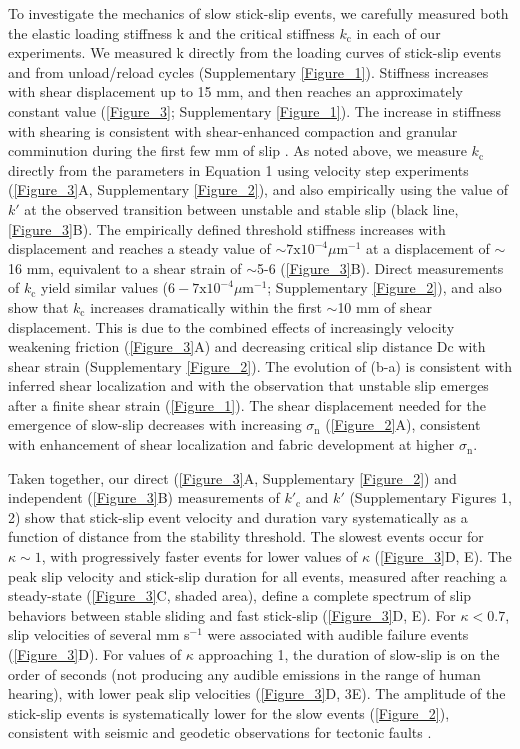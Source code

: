 To investigate the mechanics of slow stick-slip events, we carefully measured both the elastic loading stiffness k and the critical stiffness $k_\text{c}$ in each of our experiments.  We measured k directly from the loading curves of stick-slip events and from unload/reload cycles (Supplementary \ref{Figure_1}).  Stiffness increases with shear displacement up to 15 mm, and then reaches an approximately constant value (\ref{Figure_3}; Supplementary \ref{Figure_1}). The increase in stiffness with shearing is consistent with shear-enhanced compaction and granular comminution during the first few mm of slip \cite{marone1998laboratory}. As noted above, we measure $k_\text{c}$ directly from the parameters in Equation 1 using velocity step experiments (\ref{Figure_3}A, Supplementary \ref{Figure_2}), and also empirically using the value of $k'$ at the observed transition between unstable and stable slip (black line, \ref{Figure_3}B). The empirically defined threshold stiffness increases with displacement and reaches a steady value of $\sim 7\text{x}10^{-4} \mu \text{m}^{-1}$ at a displacement of $\sim$16 mm, equivalent to a shear strain of $\sim$5-6 (\ref{Figure_3}B). Direct measurements of $k_\text{c}$ yield similar values ($6-7\text{x}10^{-4} \mu \text{m}^{-1}$; Supplementary \ref{Figure_2}), and also show that $k_\text{c}$ increases dramatically within the first $\sim$10 mm of shear displacement. This is due to the combined effects of increasingly velocity weakening friction (\ref{Figure_3}A) and decreasing critical slip distance Dc with shear strain (Supplementary \ref{Figure_2}). The evolution of (b-a) is consistent with inferred shear localization and with the observation that unstable slip emerges after a finite shear strain (\ref{Figure_1}). The shear displacement needed for the emergence of slow-slip decreases with increasing $\sigma_\text{n}$ (\ref{Figure_2}A), consistent with enhancement of shear localization and fabric development at higher $\sigma_\text{n}$.  

Taken together, our direct (\ref{Figure_3}A, Supplementary \ref{Figure_2}) and independent (\ref{Figure_3}B) measurements of $k'_\text{c}$ and $k'$ (Supplementary Figures 1, 2) show that stick-slip event velocity and duration vary systematically as a function of distance from the stability threshold. The slowest events occur for $\kappa \sim 1$, with progressively faster events for lower values of $\kappa$ (\ref{Figure_3}D, E). The peak slip velocity and stick-slip duration for all events, measured after reaching a steady-state (\ref{Figure_3}C, shaded area), define a complete spectrum of slip behaviors between stable sliding and fast stick-slip (\ref{Figure_3}D, E). For $\kappa < 0.7$, slip velocities of several mm s$^{-1}$ were associated with audible failure events (\ref{Figure_3}D). For values of $\kappa$ approaching 1, the duration of slow-slip is on the order of seconds (not producing any audible emissions in the range of human hearing), with lower peak slip velocities (\ref{Figure_3}D, 3E). The amplitude of the stick-slip events is systematically lower for the slow events (\ref{Figure_2}), consistent with seismic and geodetic observations for tectonic faults \cite{ide2007scaling,peng2010integrated,brodsky2007creep}.

